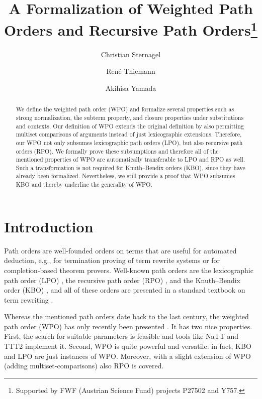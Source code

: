 \documentclass[11pt,a4paper]{article}
\begin{document}
\title{A Formalization of Weighted Path Orders and Recursive Path Orders\footnote{Supported by FWF (Austrian Science Fund) projects P27502 and Y757.}}
\author{Christian Sternagel \and Ren\'e Thiemann \and Akihisa Yamada}
\maketitle

\begin{abstract}
We define the weighted path order (WPO) and formalize several
properties such as strong normalization, the subterm property, and closure properties
under substitutions and contexts. Our definition of WPO extends the original definition by also permitting
multiset comparisons of arguments instead of just lexicographic extensions. Therefore, our WPO not only
subsumes lexicographic path orders (LPO), but also recursive path orders (RPO).
We formally prove these subsumptions and therefore all of the mentioned properties of WPO
are automatically transferable to LPO and RPO as well. 
Such a transformation is not required for Knuth--Bendix orders (KBO),
since they have already been formalized. Nevertheless, we still provide a proof that WPO subsumes KBO
and thereby underline the generality of WPO. 
\end{abstract}

\tableofcontents

\section{Introduction}

Path orders are well-founded orders on terms that are useful for automated deduction,
e.g., for termination proving of term rewrite systems or for completion-based theorem
provers. Well-known path orders are the lexicographic path order (LPO) \cite{LPO},
the recursive path order (RPO) \cite{RPO}, and the Knuth--Bendix order (KBO) \cite{KB70},
and all of these orders are presented in a standard textbook on term rewriting \cite[Chapter~5]{BN98}.

Whereas the mentioned path orders date back to the last century, the 
weighted path order (WPO) has only recently been presented \cite{WPO-PPDP,WPO}. It has two nice properties.
First, the search for suitable parameters is feasible and tools like NaTT and TTT2 implement it.
Second, WPO is quite powerful and versatile: in fact, KBO and LPO are just instances of WPO.
Moreover, with a slight extension of WPO (adding multiset-comparisons) also RPO is covered.
\end{document}
